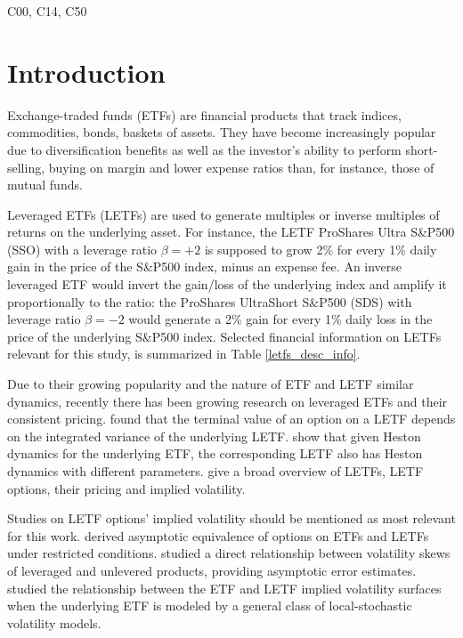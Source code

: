 \documentclass{rQUF2e}
\theoremstyle{plain}
\theoremstyle{definition}
\begin{document}
	\begin{classcode}C00, C14, C50\end{classcode}
	
		
	\section{Introduction}
	Exchange-traded funds (ETFs) are financial products that track indices, commodities, bonds, baskets of assets. They have become increasingly popular due to diversification benefits as well as the investor's ability to perform short-selling, buying on margin and lower expense ratios than, for instance, those of mutual funds.
	
	Leveraged ETFs (LETFs) are used to generate multiples or inverse multiples of returns on the underlying asset. For instance, the LETF ProShares Ultra S\&P500 (SSO) with a leverage ratio $\beta = +2$ is supposed to grow 2\% for every 1\% daily gain in the price of the S\&P500 index, minus an expense fee. An inverse leveraged ETF would invert the gain/loss of the underlying index and amplify it proportionally to the ratio: the ProShares UltraShort S\&P500 (SDS) with leverage ratio $\beta = -2$ would generate a 2\% gain for every 1\% daily loss in the price of the underlying S\&P500 index. Selected financial information on LETFs relevant for this study, is summarized in Table \ref{letfs_desc_info}.
	
	Due to their growing popularity and the nature of ETF and LETF similar dynamics, recently there has been growing research on leveraged ETFs and their consistent pricing. \citet{avellaneda_zhang} found that the terminal value of an option on a LETF depends on the integrated variance of the underlying LETF. \citet{ahn_et_al} show that given Heston dynamics for the underlying ETF, the corresponding LETF also has Heston dynamics with different parameters. \citet{leung_santoli} give a broad overview of LETFs, LETF options, their pricing and implied volatility.
	
	Studies on LETF options' implied volatility should be mentioned as most relevant for this work. \citet{figueroa_lopez_et_al} derived asymptotic equivalence of options on ETFs and LETFs under restricted conditions. \citet{lee_wang} studied a direct relationship between volatility skews of leveraged and unlevered products, providing asymptotic error estimates. \citet{leung_et_al} studied the relationship between the ETF and LETF implied volatility surfaces when the underlying ETF is modeled by a general class of local-stochastic volatility models.
	
\end{document}
